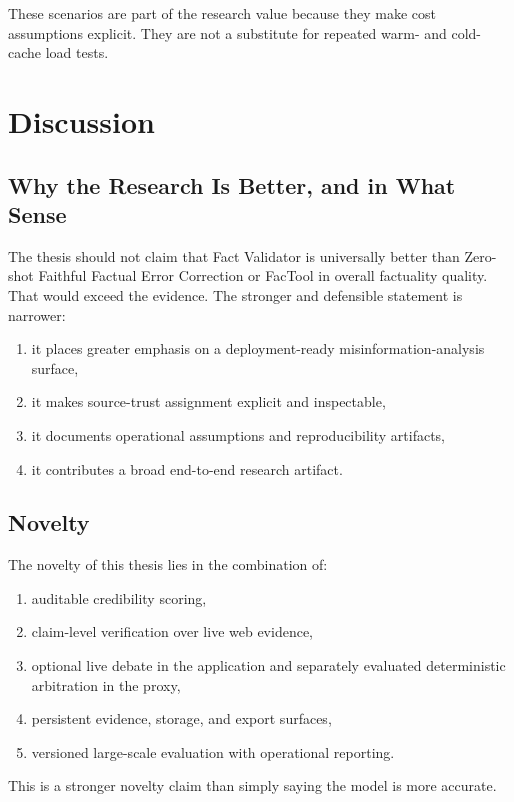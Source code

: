 \documentclass[12pt,a4paper,openright]{report}
\begin{document}
These scenarios are part of the research value because they make cost assumptions explicit. They are not a substitute for repeated warm- and cold-cache load tests.

\chapter{Discussion}

\section{Why the Research Is Better, and in What Sense}

The thesis should not claim that Fact Validator is universally better than Zero-shot Faithful Factual Error Correction or FacTool in overall factuality quality. That would exceed the evidence. The stronger and defensible statement is narrower:

\begin{enumerate}
  \item it places greater emphasis on a deployment-ready misinformation-analysis surface,
  \item it makes source-trust assignment explicit and inspectable,
  \item it documents operational assumptions and reproducibility artifacts,
  \item it contributes a broad end-to-end research artifact.
\end{enumerate}

\section{Novelty}

The novelty of this thesis lies in the combination of:

\begin{enumerate}
  \item auditable credibility scoring,
  \item claim-level verification over live web evidence,
  \item optional live debate in the application and separately evaluated deterministic arbitration in the proxy,
  \item persistent evidence, storage, and export surfaces,
  \item versioned large-scale evaluation with operational reporting.
\end{enumerate}

This is a stronger novelty claim than simply saying the model is more accurate.
\end{document}
